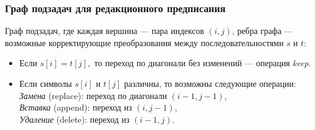 \documentclass[10pt]{beamer}
\begin{document}




\begin{frame}
\frametitle{Граф подзадач для редакционного предписания}

\begin{small}    




Граф подзадач, где каждая вершина --- пара индексов \( (i,j) \), ребра графа --- возможные корректирующие преобразования между последовательностями $s$ и $t$:


\begin{itemize}
\item Если $ s[i] = t[j], $ то переход по диагонали без изменений --- операция \textit{keep}.
\item Если символы \( s[i] \) и \( t[j] \) различны, то возможны следующие операции:\\
    \textit{Замена} (replace): переход по диагонали $ (i-1, j-1) $,\\
    \textit{Вставка} (append): переход из \( (i, j-1) \),\\
    \textit{Удаление} (delete): переход из \( (i-1, j) \).
\end{itemize}


\end{small}
\end{frame}
\end{document}
